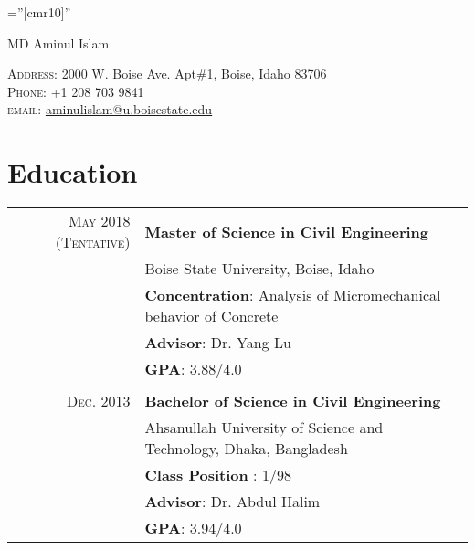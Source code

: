 \documentclass[a4paper,10pt]{article}
\begin{document}

\pagestyle{empty} %

\font\fb=''[cmr10]'' %

\begin{center}
		{\Huge MD Aminul Islam}
\end{center}


\begin{center}
    \textsc{Address:}  2000 W. Boise Ave. Apt\#1, Boise, Idaho 83706\\
    \textsc{Phone:}  +1 208 703 9841\\
    \textsc{email:}  \href{mailto:aminulislam@u.boisestate.edu}{aminulislam@u.boisestate.edu}
\noindent\makebox[\linewidth]{\rule{\paperwidth}{1pt}}
\end{center}


\section{Education}
\begin{tabular}{rl}	
 
 \textsc{May 2018 (Tentative)} & \textbf{Master of Science in Civil Engineering}\\ 
 &Boise State University, Boise, Idaho\\
& \textbf{Concentration}: Analysis of Micromechanical behavior of Concrete\\
& \textbf{Advisor}: Dr. Yang Lu\\
&\textbf{GPA}: 3.88/4.0\\
&\\
\textsc{Dec.} 2013& \textbf{Bachelor of Science in Civil Engineering} \\
 &Ahsanullah University of Science and Technology, Dhaka, Bangladesh\\
 &\textbf{Class Position} : 1/98\\
&  \textbf{Advisor}: Dr. Abdul Halim\\
&\textbf{GPA}: 3.94/4.0
\end{tabular}
\end{document}

